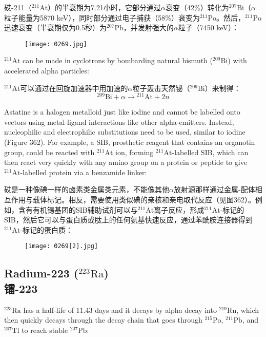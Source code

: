 \documentclass[dvipsnames, svgnames,a4paper,11pt]{article}
\begin{document}
砹-211（\(\mathrm{^{211}At}\)）的半衰期为7.21小时，它部分通过$\alpha$衰变（42\%）转化为\(\mathrm{^{207}Bi}\)（$\alpha$粒子能量为5870 keV），同时部分通过电子捕获（58\%）衰变为\(\mathrm{^{211}Po}\)。然后，\(\mathrm{^{211}Po}\)迅速衰变（半衰期仅为0.5秒）为\(\mathrm{^{207}Pb}\)，并发射强大的$\alpha$粒子（7450 keV）：

\begin{figure}[h]
	\centering
    \texttt{[image: 0269.jpg]}  
     \label{fig361}
\end{figure}

\(\mathrm{^{211}At}\) can be made in cyclotrons by bombarding natural bismuth (\(\mathrm{^{209}Bi}\)) with accelerated alpha particles:

\(\mathrm{^{211}At}\)可以通过在回旋加速器中用加速的$\alpha$粒子轰击天然铋（\(\mathrm{^{209}Bi}\)）来制得：
\[
\mathrm{^{209}Bi} + \alpha \rightarrow \mathrm{^{211}At} + 2n
\]

Astatine is a halogen metalloid just like iodine and cannot be labelled onto vectors using metal-ligand interactions like other alpha-emitters. Instead, nucleophilic and electrophilic substitutions need to be used, similar to iodine (Figure 362). For example, a SIB, prosthetic reagent that contains an organotin group, could be reacted with \(\mathrm{^{211}At}\) ion, forming \(\mathrm{^{211}At}\)-labelled SIB, which can then react very quickly with any amino group on a protein or peptide to give \(\mathrm{^{211}At}\)-labelled protein via a benzamide linker:

砹是一种像碘一样的卤素类金属类元素，不能像其他$\alpha$放射源那样通过金属-配体相互作用与载体标记。相反，需要使用类似碘的亲核和亲电取代反应（见图362）。例如，含有有机锡基团的SIB辅助试剂可以与\(\mathrm{^{211}At}\)离子反应，形成\(\mathrm{^{211}At}\)-标记的SIB，然后它可以与蛋白质或肽上的任何氨基快速反应，通过苯酰胺连接器得到\(\mathrm{^{211}At}\)-标记的蛋白质：

\begin{figure}[h]
	\centering
    \texttt{[image: 0269[2].jpg]}  
     \label{fig362}
\end{figure}

\subsection{Radium-223 (\(\mathrm{^{223}Ra}\)) \\镭-223}  
\(\mathrm{^{223}Ra}\) has a half-life of 11.43 days and it decays by alpha decay into \(\mathrm{^{219}Rn}\), which then quickly decays through the decay chain that goes through \(\mathrm{^{215}Po}\), \(\mathrm{^{211}Pb}\), and \(\mathrm{^{207}Tl}\) to reach stable \(\mathrm{^{207}Pb}\):
\end{document}
